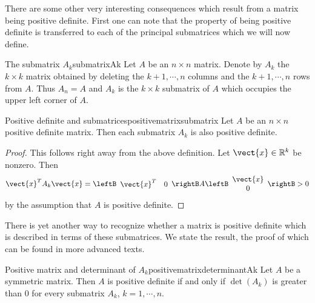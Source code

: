 There are some other very interesting consequences which result from a
matrix being positive definite. First one can note that the property of
being positive definite is transferred to each of the principal submatrices which we will now define.

\begin{definition}{The submatrix $A_k$}{submatrixAk}
Let $A$ be an $n\times n$ matrix. Denote by $A_{k}$ the $k\times k$ matrix
obtained by deleting the $k+1,\cdots ,n$ columns and the $k+1,\cdots ,n$
rows from $A.$ Thus $A_{n}=A$ and $A_{k}$ is the $k\times k$ submatrix of $A$
which occupies the upper left corner of $A.$
\end{definition}

\begin{lemma}{Positive definite and submatrices}{positivematrixsubmatrix}
Let $A$ be an $n\times n$ positive definite matrix.  Then each submatrix $A_{k}$ is also positive definite.
\end{lemma}

\begin{proof}
This follows right away from the above definition. Let $\vect{x}\in \mathbb{R}^{k}$ be nonzero. Then 
\begin{equation*}
\vect{x}^{T}A_{k}\vect{x}=\leftB 
\begin{array}{cc}
\vect{x}^{T} & 0
\end{array}
\rightB A\leftB 
\begin{array}{c}
\vect{x} \\ 
0
\end{array}
\rightB >  0
\end{equation*}
by the assumption that $A$ is positive definite.
\end{proof}

There is yet another way to recognize whether a matrix is positive definite
which is described in terms of these submatrices. We state the result,  the proof
of which can be found in more advanced texts.

\begin{theorem}{Positive matrix and determinant of $A_k$}{positivematrixdeterminantAk}   
Let $A$ be a symmetric matrix. Then $A$ is positive definite if
and only if $\det \left( A_{k}\right)$ is greater than $0$ for every submatrix $A_{k}$,  $k=1,\cdots ,n$. 
\end{theorem}

